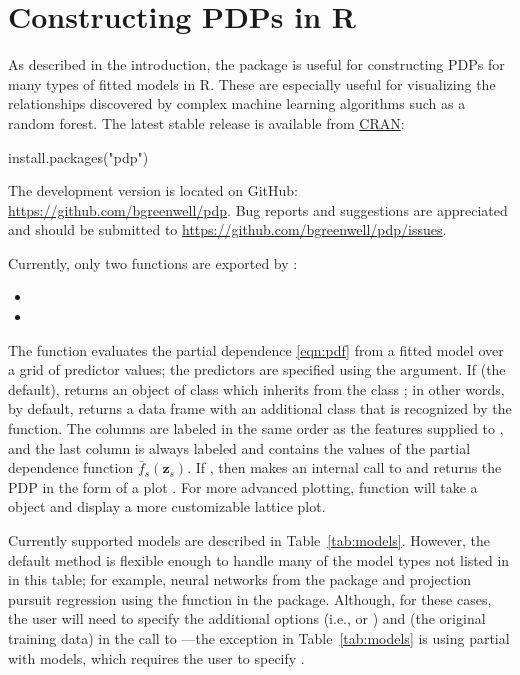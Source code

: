 \section{Constructing PDPs in R}

As described in the introduction, the  package is useful for constructing PDPs for many types of fitted models in R. These are especially useful for visualizing the relationships discovered by complex machine learning algorithms such as a random forest. The latest stable release is available from \href{https://cran.r-project.org/package=pdp}{CRAN}:
\begin{example}
install.packages("pdp")
\end{example}
The development version is located on GitHub: \url{https://github.com/bgreenwell/pdp}. Bug reports and suggestions are appreciated and should be submitted to \url{https://github.com/bgreenwell/pdp/issues}.

Currently, only two functions are exported by :
\begin{itemize}
  \item {}
  \item {}
\end{itemize}
The  function evaluates the partial dependence \eqref{eqn:pdf} from a fitted model over a grid of predictor values; the predictors are specified using the  argument. If  (the default),  returns an object of class  which inherits from the class ; in other words, by default,  returns a data frame with an additional class that is recognized by the  function. The columns are labeled in the same order as the features supplied to , and the last column is always labeled  and contains the values of the partial dependence function $\bar{f}_s\left(\boldsymbol{z}_s\right)$. If , then  makes an internal call to  and returns the PDP in the form of a  plot \citep{lattice-pkg}. For more advanced plotting,  function will take a  object and display a more customizable lattice plot.

Currently supported models are described in Table~\ref{tab:models}. However, the default method  is flexible enough to handle many of the model types not listed in in this table; for example, neural networks from the  package \citep{venables-modern-2002} and projection pursuit regression \citep{friedman-ppr-1981} using the  function in the  package. Although, for these cases, the user will need to specify the additional options  (i.e.,  or ) and  (the original training data) in the call to ---the exception in Table~\ref{tab:models} is using partial with  models, which requires the user to specify .


